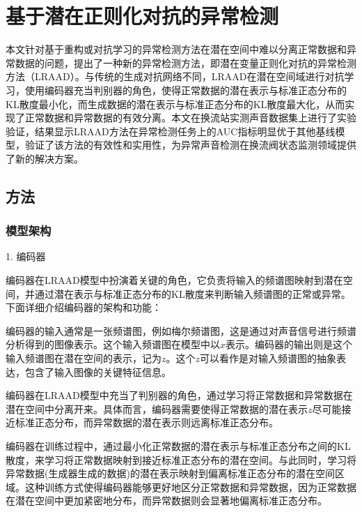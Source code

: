 \section{基于潜在正则化对抗的异常检测}

本文针对基于重构或对抗学习的异常检测方法在潜在空间中难以分离正常数据和异常数据的问题，提出了一种新的异常检测方法，即潜在变量正则化对抗的异常检测方法（LRAAD）。与传统的生成对抗网络不同，LRAAD在潜在空间域进行对抗学习，使用编码器充当判别器的角色，使得正常数据的潜在表示与标准正态分布的KL散度最小化，而生成数据的潜在表示与标准正态分布的KL散度最大化，从而实现了正常数据和异常数据的有效分离。本文在换流站实测声音数据集上进行了实验验证，结果显示LRAAD方法在异常检测任务上的AUC指标明显优于其他基线模型，验证了该方法的有效性和实用性，为异常声音检测在换流阀状态监测领域提供了新的解决方案。


\subsection{方法}
\subsubsection{模型架构}


1. 编码器

编码器在LRAAD模型中扮演着关键的角色，它负责将输入的频谱图映射到潜在空间，并通过潜在表示与标准正态分布的KL散度来判断输入频谱图的正常或异常。下面详细介绍编码器的架构和功能：

编码器的输入通常是一张频谱图，例如梅尔频谱图，这是通过对声音信号进行频谱分析得到的图像表示。这个输入频谱图在模型中以$x$表示。编码器的输出则是这个输入频谱图在潜在空间的表示，记为$z$。这个$z$可以看作是对输入频谱图的抽象表达，包含了输入图像的关键特征信息。

编码器在LRAAD模型中充当了判别器的角色，通过学习将正常数据和异常数据在潜在空间中分离开来。具体而言，编码器需要使得正常数据的潜在表示$z$尽可能接近标准正态分布，而异常数据的潜在表示则远离标准正态分布。

    编码器在训练过程中，通过最小化正常数据的潜在表示与标准正态分布之间的KL散度，来学习将正常数据映射到接近标准正态分布的潜在空间。与此同时，学习将异常数据(生成器生成的数据)的潜在表示映射到偏离标准正态分布的潜在空间区域。这种训练方式使得编码器能够更好地区分正常数据和异常数据，因为正常数据在潜在空间中更加紧密地分布，而异常数据则会显著地偏离标准正态分布。
    
